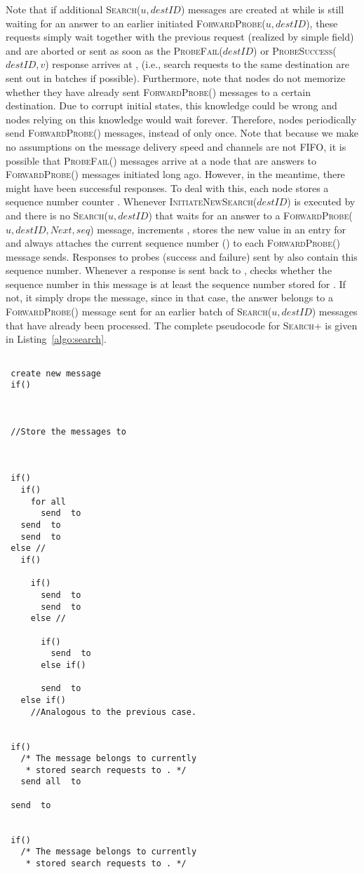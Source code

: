 \documentclass[a4paper,USenglish]{lipics}
\newcommand{\srp}{\textsc{Search+}\xspace}
\newcommand{\search}[1]{\textsc{Search(\ensuremath{#1})}\xspace}
\newcommand{\initsearch}[1]{\textsc{InitiateNewSearch(\ensuremath{#1})}\xspace}
\newcommand{\forwardprobe}[1]{\textsc{ForwardProbe(\ensuremath{#1})}\xspace}
\newcommand{\psuccess}[1]{\textsc{ProbeSuccess(\ensuremath{#1})}\xspace}
\newcommand{\pfail}[1]{\textsc{ProbeFail(\ensuremath{#1})}\xspace}
\begin{document}
Note that if additional \search{u,destID} messages are created at  while  is still waiting for an answer to an earlier initiated \forwardprobe{u,destID}, these requests simply wait together with the previous request (realized by simple  field) and are aborted or sent as soon as the \pfail{destID} or \psuccess{destID,v} response arrives at , (i.e., search requests to the same destination are sent out in batches if possible).
Furthermore, note that nodes do not memorize whether they have already sent \forwardprobe{} messages to a certain destination. Due to corrupt initial states, this knowledge could be wrong and nodes relying on this knowledge would wait forever.
Therefore, nodes periodically send \forwardprobe{} messages, instead of only once.
Note that because we make no assumptions on the message delivery speed and channels are not FIFO, it is possible that \pfail{} messages arrive at a node  that are answers to \forwardprobe{} messages initiated long ago.
However, in the meantime, there might have been successful responses.
To deal with this, each node  stores a sequence number counter .
Whenever \initsearch{destID} is executed by  and there is no \search{u,destID} that waits for an answer to a \forwardprobe{u,destID, Next, seq} message,  increments , stores the new  value in an entry for  and always attaches the current sequence number () to each \forwardprobe{} message  sends.
Responses to probes (success and failure) sent by  also contain this sequence number.
Whenever a response is sent back to ,  checks whether the sequence number in this message is at least the sequence number stored for .
If not, it simply drops the message, since in that case, the answer belongs to a \forwardprobe{} message sent for an earlier batch of \search{u,destID} messages that have already been processed.
The complete pseudocode for \srp is given in Listing~\ref{algo:search}.


\begin{lstlisting}[mathescape=true,float,caption=\srp protocol,label=algo:search]

 create new message 
 if()
   
   
   
 //Store the messages to  
  


 if()
   if()
     for all 
       send  to 
   send  to 
   send  to 
 else //
   if()
     
     if()
       send  to 
       send  to 
     else //
       
       if()
         send  to 
       else if()
         
       send  to 
   else if() 
     //Analogous to the previous case.
 

 if()
   /* The message belongs to currently  
    * stored search requests to . */
   send all  to 
   
 send  to 
 

 if()
   /* The message belongs to currently  
    * stored search requests to . */
   
\end{lstlisting}
\end{document}
